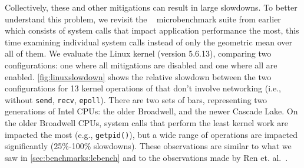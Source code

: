 Collectively, these and other mitigations can result in large
slowdowns. 
To better understand this problem, we revisit the 
\bench~\cite{lebench} microbenchmark suite from earlier which
consists of system calls
that impact application
performance the most, this time examining individual system calls instead of only the geometric mean over all of them.
We evaluate the Linux kernel (version 5.6.13),
comparing two configurations: one where all mitigations are disabled
and one where all are enabled. \autoref{fig:linuxslowdown} shows
the relative slowdown between the two configurations for 13 kernel
operations of \bench that don't involve networking (i.e., without
\texttt{send}, \texttt{recv}, \texttt{epoll}).  There are two sets of
bars, representing two generations of Intel CPUs: the older Broadwell,
and the newer Cascade Lake.  On the older Broadwell CPUs,
system calls that perform the least kernel work are impacted the most
(e.g., \texttt{getpid()}), but a wide range of operations are impacted
significantly (25\%-100\% slowdowns). These observations are similar
to what we saw in \autoref{sec:benchmarks:lebench} and to the observations made by Ren et. al.~\cite{lebench}.



